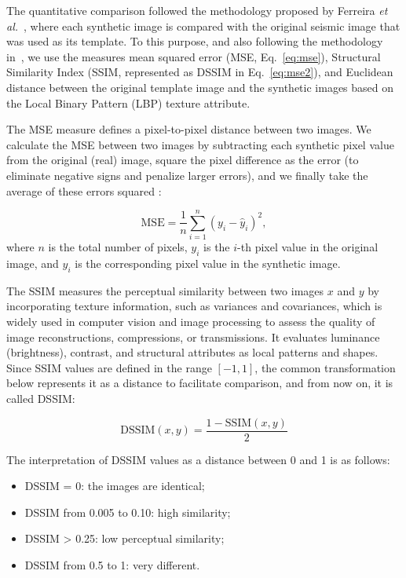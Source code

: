 \documentclass{ieeeaccess}
\begin{document}
The quantitative comparison followed the methodology proposed by Ferreira \emph{et al.}~\cite{Ferreira2020}, where each synthetic image is compared with the original seismic image that was used as its template. To this purpose, and also following the methodology in~\cite{Ferreira2020}, we use the measures mean squared error (MSE, Eq.~\ref{eq:mse}), Structural Similarity Index (SSIM, represented as DSSIM in Eq.~\ref{eq:mse2}), and Euclidean distance between the original template image and the synthetic images based on the Local Binary Pattern (LBP) texture attribute.

The MSE measure defines a pixel-to-pixel distance between two images. We calculate the MSE between two images by   subtracting each synthetic pixel value from the original (real) image, square the pixel difference as the error (to eliminate  negative signs and penalize larger errors), and we finally take the average of these errors squared :

\begin{equation}
\label{eq:mse}
\text{MSE} = \frac{1}{n} \sum_{i=1}^{n} (y_i - \hat{y}_i)^2,
\end{equation}
where $n$ is the total number of pixels, $y_i$ is the $i$-th pixel value in the original image, and $\hat{y}_i$ is the corresponding pixel value in the synthetic image.

The SSIM measures the perceptual similarity between two images $x$ and $y$ by incorporating texture information, such as variances and covariances, which is widely used in computer vision and image processing to assess the quality of image reconstructions, compressions, or transmissions. It evaluates luminance (brightness), contrast, and structural attributes as local patterns and shapes. Since SSIM values are defined in the range $[-1, 1]$, the common transformation below  represents it as a distance to facilitate comparison, and from now on, it is called DSSIM:

\begin{equation}
\label{eq:mse2}
\text{DSSIM}(x, y) = \frac{1 - \text{SSIM}(x, y)}{2}
\end{equation}

The interpretation of DSSIM values as a distance between 0 and 1 is as follows: 

\begin{itemize}
    \item DSSIM = 0: the images are identical;
    \item DSSIM from 0.005 to 0.10: high similarity;
    \item DSSIM > 0.25: low perceptual similarity;
    \item DSSIM from 0.5 to 1: very different.
\end{itemize}
\end{document}
